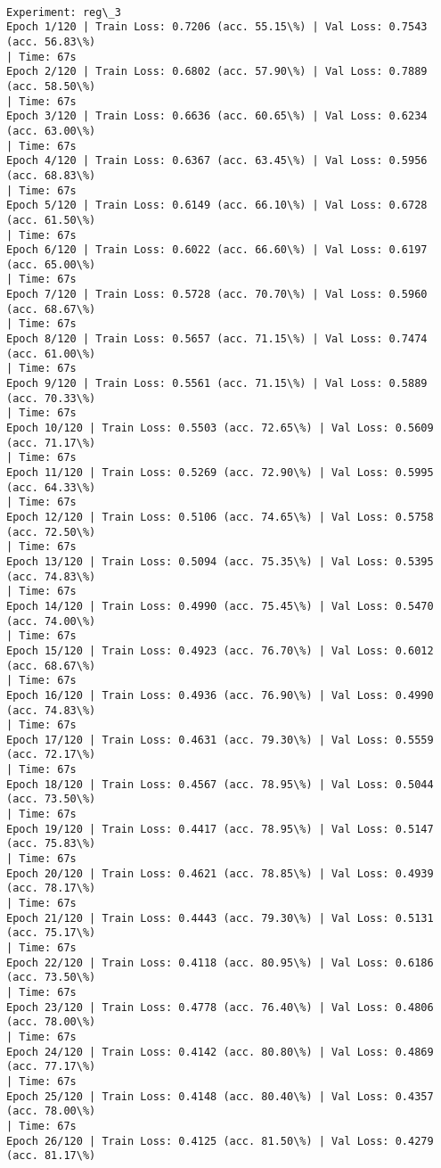 \documentclass[8pt]{extarticle}
\begin{document}
    \begin{Verbatim}[commandchars=\\\{\}]

Experiment: reg\_3
Epoch 1/120 | Train Loss: 0.7206 (acc. 55.15\%) | Val Loss: 0.7543 (acc. 56.83\%)
| Time: 67s
Epoch 2/120 | Train Loss: 0.6802 (acc. 57.90\%) | Val Loss: 0.7889 (acc. 58.50\%)
| Time: 67s
Epoch 3/120 | Train Loss: 0.6636 (acc. 60.65\%) | Val Loss: 0.6234 (acc. 63.00\%)
| Time: 67s
Epoch 4/120 | Train Loss: 0.6367 (acc. 63.45\%) | Val Loss: 0.5956 (acc. 68.83\%)
| Time: 67s
Epoch 5/120 | Train Loss: 0.6149 (acc. 66.10\%) | Val Loss: 0.6728 (acc. 61.50\%)
| Time: 67s
Epoch 6/120 | Train Loss: 0.6022 (acc. 66.60\%) | Val Loss: 0.6197 (acc. 65.00\%)
| Time: 67s
Epoch 7/120 | Train Loss: 0.5728 (acc. 70.70\%) | Val Loss: 0.5960 (acc. 68.67\%)
| Time: 67s
Epoch 8/120 | Train Loss: 0.5657 (acc. 71.15\%) | Val Loss: 0.7474 (acc. 61.00\%)
| Time: 67s
Epoch 9/120 | Train Loss: 0.5561 (acc. 71.15\%) | Val Loss: 0.5889 (acc. 70.33\%)
| Time: 67s
Epoch 10/120 | Train Loss: 0.5503 (acc. 72.65\%) | Val Loss: 0.5609 (acc. 71.17\%)
| Time: 67s
Epoch 11/120 | Train Loss: 0.5269 (acc. 72.90\%) | Val Loss: 0.5995 (acc. 64.33\%)
| Time: 67s
Epoch 12/120 | Train Loss: 0.5106 (acc. 74.65\%) | Val Loss: 0.5758 (acc. 72.50\%)
| Time: 67s
Epoch 13/120 | Train Loss: 0.5094 (acc. 75.35\%) | Val Loss: 0.5395 (acc. 74.83\%)
| Time: 67s
Epoch 14/120 | Train Loss: 0.4990 (acc. 75.45\%) | Val Loss: 0.5470 (acc. 74.00\%)
| Time: 67s
Epoch 15/120 | Train Loss: 0.4923 (acc. 76.70\%) | Val Loss: 0.6012 (acc. 68.67\%)
| Time: 67s
Epoch 16/120 | Train Loss: 0.4936 (acc. 76.90\%) | Val Loss: 0.4990 (acc. 74.83\%)
| Time: 67s
Epoch 17/120 | Train Loss: 0.4631 (acc. 79.30\%) | Val Loss: 0.5559 (acc. 72.17\%)
| Time: 67s
Epoch 18/120 | Train Loss: 0.4567 (acc. 78.95\%) | Val Loss: 0.5044 (acc. 73.50\%)
| Time: 67s
Epoch 19/120 | Train Loss: 0.4417 (acc. 78.95\%) | Val Loss: 0.5147 (acc. 75.83\%)
| Time: 67s
Epoch 20/120 | Train Loss: 0.4621 (acc. 78.85\%) | Val Loss: 0.4939 (acc. 78.17\%)
| Time: 67s
Epoch 21/120 | Train Loss: 0.4443 (acc. 79.30\%) | Val Loss: 0.5131 (acc. 75.17\%)
| Time: 67s
Epoch 22/120 | Train Loss: 0.4118 (acc. 80.95\%) | Val Loss: 0.6186 (acc. 73.50\%)
| Time: 67s
Epoch 23/120 | Train Loss: 0.4778 (acc. 76.40\%) | Val Loss: 0.4806 (acc. 78.00\%)
| Time: 67s
Epoch 24/120 | Train Loss: 0.4142 (acc. 80.80\%) | Val Loss: 0.4869 (acc. 77.17\%)
| Time: 67s
Epoch 25/120 | Train Loss: 0.4148 (acc. 80.40\%) | Val Loss: 0.4357 (acc. 78.00\%)
| Time: 67s
Epoch 26/120 | Train Loss: 0.4125 (acc. 81.50\%) | Val Loss: 0.4279 (acc. 81.17\%)

\end{Verbatim}
\end{document}
